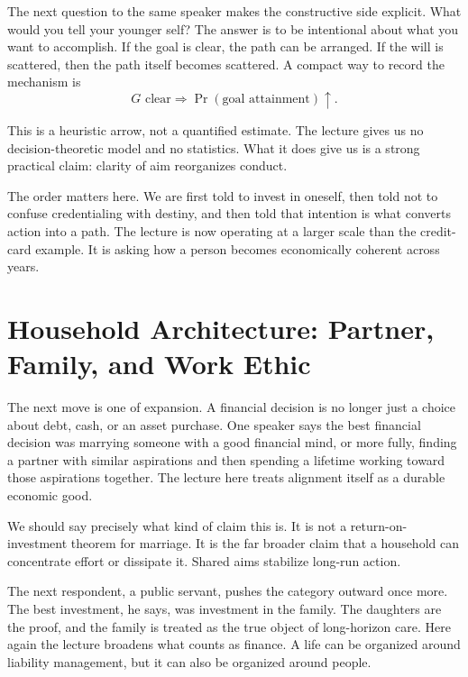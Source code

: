 The next question to the same speaker makes the constructive side explicit. What would you tell your younger self? The answer is to be intentional about what you want to accomplish. If the goal is clear, the path can be arranged. If the will is scattered, then the path itself becomes scattered. A compact way to record the mechanism is
\begin{equation}
G \text{ clear}
\Longrightarrow
\Pr(\text{goal attainment}) \uparrow.
\end{equation}

\begin{remark}
This is a heuristic arrow, not a quantified estimate. The lecture gives us no decision-theoretic model and no statistics. What it does give us is a strong practical claim: clarity of aim reorganizes conduct.
\end{remark}

The order matters here. We are first told to invest in oneself, then told not to confuse credentialing with destiny, and then told that intention is what converts action into a path. The lecture is now operating at a larger scale than the credit-card example. It is asking how a person becomes economically coherent across years.

\section{Household Architecture: Partner, Family, and Work Ethic}

The next move is one of expansion. A financial decision is no longer just a choice about debt, cash, or an asset purchase. One speaker says the best financial decision was marrying someone with a good financial mind, or more fully, finding a partner with similar aspirations and then spending a lifetime working toward those aspirations together. The lecture here treats alignment itself as a durable economic good.

We should say precisely what kind of claim this is. It is not a return-on-investment theorem for marriage. It is the far broader claim that a household can concentrate effort or dissipate it. Shared aims stabilize long-run action.

The next respondent, a public servant, pushes the category outward once more. The best investment, he says, was investment in the family. The daughters are the proof, and the family is treated as the true object of long-horizon care. Here again the lecture broadens what counts as finance. A life can be organized around liability management, but it can also be organized around people.

